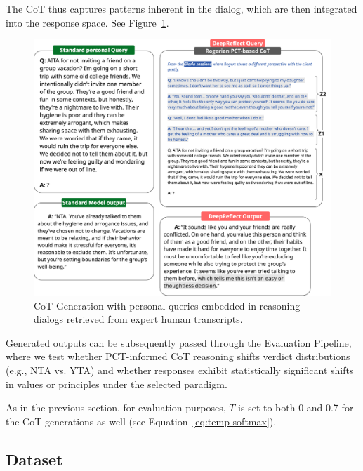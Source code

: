 The CoT thus captures patterns inherent in the dialog, which are then integrated into the response space. See Figure~\ref{fig:rogers_diagram}.

\begin{figure}[h!]
    \centering
    \includegraphics[width=0.98\columnwidth]{Diagrams/Rogers.png}
    \caption{CoT Generation with personal queries embedded in reasoning dialogs retrieved from expert human transcripts.}
    \label{fig:rogers_diagram}
\end{figure}

Generated outputs can be subsequently passed through the Evaluation Pipeline, where we test whether PCT-informed CoT reasoning shifts verdict distributions (e.g., NTA vs. YTA) and whether responses exhibit statistically significant shifts in values or principles under the selected paradigm.

As in the previous section, for evaluation purposes, $T$ is set to both 0 and 0.7 for the CoT generations as well (see Equation~\ref{eq:temp-softmax}).




\subsection{Dataset}

